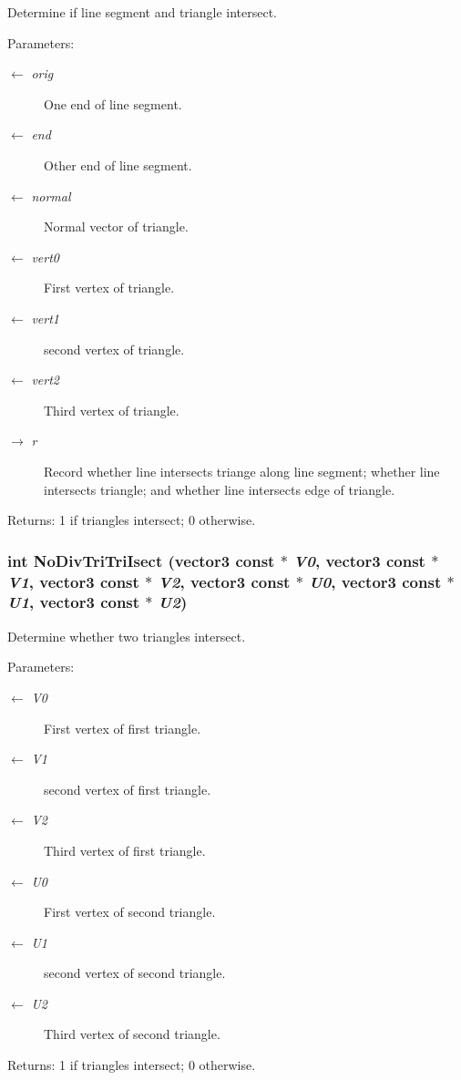 Determine if line segment and triangle intersect. \begin{Desc}
\item[Parameters:]
\begin{description}
\item[\mbox{$\leftarrow$} {\em orig}]One end of line segment. \item[\mbox{$\leftarrow$} {\em end}]Other end of line segment. \item[\mbox{$\leftarrow$} {\em normal}]Normal vector of triangle. \item[\mbox{$\leftarrow$} {\em vert0}]First vertex of triangle. \item[\mbox{$\leftarrow$} {\em vert1}]second vertex of triangle. \item[\mbox{$\leftarrow$} {\em vert2}]Third vertex of triangle. \item[\mbox{$\rightarrow$} {\em r}]Record whether line intersects triange along line segment; whether line intersects triangle; and whether line intersects edge of triangle. \end{description}
\end{Desc}
\begin{Desc}
\item[Returns:]1 if triangles intersect; 0 otherwise. \end{Desc}
\subsubsection{\setlength{\rightskip}{0pt plus 5cm}int No\-Div\-Tri\-Tri\-Isect ({\bf vector3} const $\ast$ {\em V0}, {\bf vector3} const $\ast$ {\em V1}, {\bf vector3} const $\ast$ {\em V2}, {\bf vector3} const $\ast$ {\em U0}, {\bf vector3} const $\ast$ {\em U1}, {\bf vector3} const $\ast$ {\em U2})}\label{opttritri_8h_964292b46316fc46d2be9ca9570deb64}


Determine whether two triangles intersect. \begin{Desc}
\item[Parameters:]
\begin{description}
\item[\mbox{$\leftarrow$} {\em V0}]First vertex of first triangle. \item[\mbox{$\leftarrow$} {\em V1}]second vertex of first triangle. \item[\mbox{$\leftarrow$} {\em V2}]Third vertex of first triangle. \item[\mbox{$\leftarrow$} {\em U0}]First vertex of second triangle. \item[\mbox{$\leftarrow$} {\em U1}]second vertex of second triangle. \item[\mbox{$\leftarrow$} {\em U2}]Third vertex of second triangle. \end{description}
\end{Desc}
\begin{Desc}
\item[Returns:]1 if triangles intersect; 0 otherwise. \end{Desc}
